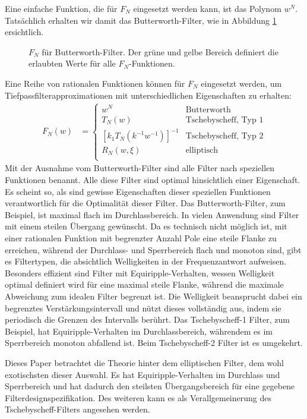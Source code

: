 Eine einfache Funktion, die für $F_N$ eingesetzt werden kann, ist das Polynom $w^N$.
Tatsächlich erhalten wir damit das Butterworth-Filter, wie in Abbildung \ref{ellfilter:fig:butterworth} ersichtlich.
\begin{figure}
    \centering
    
    \caption{$F_N$ für Butterworth-Filter. Der grüne und gelbe Bereich definiert die erlaubten Werte für alle $F_N$-Funktionen.}
    \label{ellfilter:fig:butterworth}
\end{figure}
Eine Reihe von rationalen Funktionen können für $F_N$ eingesetzt werden, um Tiefpassfilter\-approximationen mit unterschiedlichen Eigenschaften zu erhalten:
\begin{align}
    F_N(w) & =
    \begin{cases}
        w^N                            & \text{Butterworth} \\
        T_N(w)                         & \text{Tschebyscheff, Typ 1}  \\
        [k_1 T_N (k^{-1} w^{-1})]^{-1} & \text{Tschebyscheff, Typ 2}  \\
        R_N(w, \xi)                    & \text{elliptisch}    \\
    \end{cases}
\end{align}
Mit der Ausnahme vom Butterworth-Filter sind alle Filter nach speziellen Funktionen benannt.
Alle diese Filter sind optimal hinsichtlich einer Eigenschaft.
Es scheint so, als sind gewisse Eigenschaften dieser speziellen Funktionen verantwortlich für die Optimalität dieser Filter.
Das Butterworth-Filter, zum Beispiel, ist maximal flach im Durchlassbereich.
In vielen Anwendung sind Filter mit einem steilen Übergang gewünscht.
Da es technisch nicht möglich ist, mit einer rationalen Funktion mit begrenzter Anzahl Pole eine steile Flanke zu erreichen, während der Durchlass- und Sperrbereich flach und monoton sind, gibt es Filtertypen, die absichtlich Welligkeiten in der Frequenzantwort aufweisen.
Besonders effizient sind Filter mit Equiripple-Verhalten, wessen Welligkeit optimal definiert wird für eine maximal steile Flanke, während die maximale Abweichung zum idealen Filter begrenzt ist.
%
%
Die Welligkeit beansprucht dabei ein begrenztes Verstärkungsintervall und nützt dieses vollständig aus, indem sie periodisch die Grenzen des Intervalls berührt.
Das Tschebyscheff-1 Filter, zum Beispiel, hat Equiripple-Verhalten im Durchlassbereich, währendem es im Sperrbereich monoton abfallend ist.
Beim Tschebyscheff-2 Filter ist es umgekehrt.

Dieses Paper betrachtet die Theorie hinter dem elliptischen Filter, dem wohl exotischsten dieser Auswahl.
Es hat Equiripple-Verhalten im Durchlass und Sperrbereich und hat dadurch den steilsten Übergangsbereich für eine gegebene Filterdesignspezifikation.
Des weiteren kann es als Verallgemeinerung des Tschebyscheff-Filters angesehen werden.
